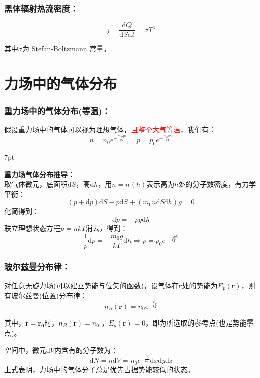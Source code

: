 \documentclass[zihao=-4,UTF8]{report}
\newenvironment{graybox}{%
\def\FrameCommand{%
\hspace{1pt}%
{\color{gray}\small \vrule width 2pt}%
{\color{graybox_color}\vrule width 4pt}%
\colorbox{graybox_color}%
}%
\MakeFramed{\advance\hsize-\width\FrameRestore}%
\noindent\hspace{-4.55pt}%
\begin{adjustwidth}{}{7pt}%
\vspace{2pt}\vspace{2pt}%
}
{%
\vspace{2pt}\end{adjustwidth}\endMakeFramed%
}
\begin{document}
\subsubsection{黑体辐射热流密度：}

\begin{equation}
    j = \frac{\mathrm{d}Q}{\mathrm{d}S\mathrm{d}t} = \sigma T^4
\end{equation}\par
{\color{gray}\small 其中$\sigma$为 Stefan-Boltzmann 常量。}
\section{力场中的气体分布}

\subsubsection{重力场中的气体分布(等温)：}
假设重力场中的气体可以视为理想气体，\textcolor{red}{且整个大气等温}，我们有：
\begin{equation}
    n = n_0e^{-\frac{m_0gh}{kT}},\ \ \ \   p = p_0e^{-\frac{m_0gh}{kT}}
\end{equation}
\begin{graybox}
    \textbf{重力场气体分布推导：}\\
    取气体微元，底面积$\mathrm{d}S$，高$\mathrm{d}h$，用$n = n(h)$表示高为$h$处的分子数密度，有力学平衡：
    \begin{equation*}
        (p+\mathrm{d}p)\mathrm{d}S - p\mathrm{d}S + (m_0n\mathrm{d}S\mathrm{d}h)g = 0
    \end{equation*}
    化简得到：
    \begin{equation*}
        \mathrm{d}p = - \rho g\mathrm{d}h
    \end{equation*}
    联立理想状态方程$p = nkT$消去，得到：
    \begin{equation*}
        \frac{1}{p}\mathrm{d}p = -\frac{m_0g}{kT}\mathrm{d}h \Longrightarrow p = p_0e^{-\frac{m_0gh}{kT}}
    \end{equation*}
\end{graybox}
\subsubsection{玻尔兹曼分布律：}
对任意无旋力场(可以建立势能与位矢的函数)，设气体在$\boldsymbol{r}$处的势能为$E_p(\boldsymbol{r})$，则有玻尔兹曼(位置)分布律：
\begin{equation}
    n_B(\boldsymbol{r}) = n_0e^{-\frac{E_p}{kT}}
\end{equation}\par
其中，$\boldsymbol{r} = \boldsymbol{r_0}$时，$n_B(\boldsymbol{r})= n_0$ ，$E_p(\boldsymbol{r}) = 0$，即为所选取的参考点(也是势能零点)。\par
空间中，微元$\mathrm{d}V$内含有的分子数为：
\begin{equation}
    \mathrm{d}N = n\mathrm{d}V = n_0e^{-\frac{E_p}{kT}}\mathrm{d}x\mathrm{d}y\mathrm{d}z
\end{equation}
{\color{gray}\small 上式表明，力场中的气体分子总是优先占据势能较低的状态。}
\end{document}
